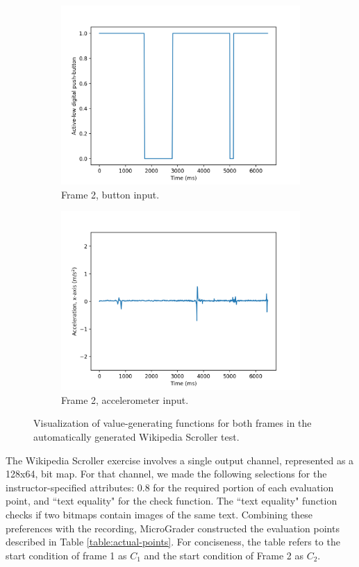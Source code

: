 \documentclass[12pt]{article}
\begin{document}
\begin{figure}[ht]
\begin{subfigure}[b]{.45\linewidth}
\includegraphics[width=\linewidth]{f1-button.png}
\caption{Frame 2, button input.}
\end{subfigure}
\begin{subfigure}[b]{.45\linewidth}
\includegraphics[width=\linewidth]{f1-acc.png}
\caption{Frame 2, accelerometer input.}
\end{subfigure}

\caption{Visualization of value-generating functions for both frames in the automatically generated Wikipedia Scroller test.}
\label{fig:actual-input-frames}
\end{figure}

The Wikipedia Scroller exercise involves a single output channel, represented as a 128x64, bit map.  For that channel, we made the following selections for the instructor-specified attributes: 0.8 for the required portion of each evaluation point, and ``text equality" for the check function.  The ``text equality" function checks if two bitmaps contain images of the same text.   Combining these preferences with the recording, MicroGrader constructed the evaluation points described in Table \ref{table:actual-points}.  For conciseness, the table refers to the start condition of frame 1 as $C_1$ and the start condition of Frame 2 as $C_2$.
\end{document}
